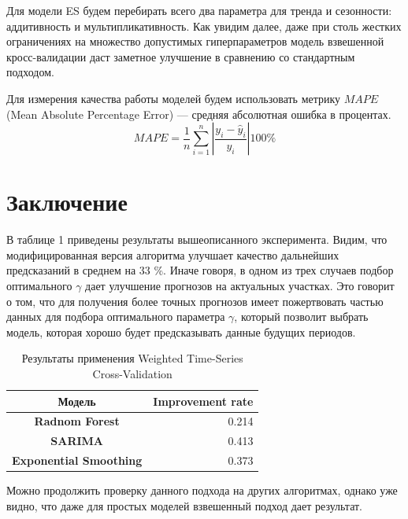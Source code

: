 \documentclass[a4paper, 14pt]{article}
\begin{document}
Для модели ES будем перебирать всего два параметра для тренда и сезонности: аддитивность и мультипликативность. Как увидим далее, даже при столь жестких ограничениях на множество допустимых гиперпараметров модель взвешенной кросс-валидации даст заметное улучшение в сравнению со стандартным подходом. 

\noindent Для измерения качества работы моделей будем использовать метрику $MAPE$ (Mean Absolute Percentage Error) --- средняя абсолютная ошибка в процентах. 
	\[MAPE = \dfrac{1}{n} \sum_{i=1}^{n} \left|	 \dfrac{y_i - \hat y_i}{y_i} \right| 100 \% \] 
	
\section{Заключение}

В таблице 1 приведены результаты вышеописанного эксперимента. Видим, что модифицированная версия алгоритма улучшает качество дальнейших предсказаний в среднем на 33 \%. Иначе говоря, в одном из трех случаев подбор оптимального $\gamma$ дает улучшение прогнозов на актуальных участках. Это говорит о том, что для получения более точных прогнозов имеет пожертвовать частью данных для подбора оптимального параметра $\gamma$, который позволит выбрать модель, которая хорошо будет предсказывать данные будущих периодов.

\begin{table}[h] \label{res} %
	\centering
	\begin{tabular}{@{}crlll@{}}
		\toprule
		Модель                         & \multicolumn{4}{c}{Improvement rate} \\ \midrule
		\textbf{Radnom Forest}         & \multicolumn{4}{r}{0.214}                \\
		\textbf{SARIMA}                & \multicolumn{4}{r}{0.413}                \\
		\textbf{Exponential Smoothing} & \multicolumn{4}{r}{0.373}                \\ \bottomrule
	\end{tabular}
	\caption{Результаты применения Weighted Time-Series Cross-Validation}
\end{table}


Можно продолжить проверку данного подхода на других алгоритмах, однако уже видно, что даже для простых моделей взвешенный подход дает результат. 






\newpage
\end{document}
